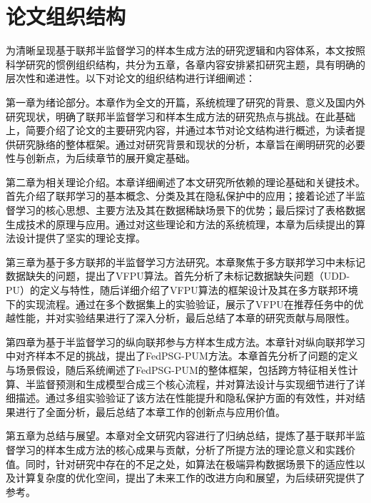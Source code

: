 \section{论文组织结构}
为清晰呈现基于联邦半监督学习的样本生成方法的研究逻辑和内容体系，本文按照科学研究的惯例组织结构，共分为五章，各章内容安排紧扣研究主题，具有明确的层次性和递进性。以下对论文的组织结构进行详细阐述：

第一章为绪论部分。本章作为全文的开篇，系统梳理了研究的背景、意义及国内外研究现状，明确了联邦半监督学习和样本生成方法的研究热点与挑战。在此基础上，简要介绍了论文的主要研究内容，并通过本节对论文结构进行概述，为读者提供研究脉络的整体框架。通过对研究背景和现状的分析，本章旨在阐明研究的必要性与创新点，为后续章节的展开奠定基础。

第二章为相关理论介绍。本章详细阐述了本文研究所依赖的理论基础和关键技术。首先介绍了联邦学习的基本概念、分类及其在隐私保护中的应用；接着论述了半监督学习的核心思想、主要方法及其在数据稀缺场景下的优势；最后探讨了表格数据生成技术的原理与应用。通过对这些理论和方法的系统梳理，本章为后续提出的算法设计提供了坚实的理论支撑。

第三章为基于多方联邦的半监督学习方法研究。本章聚焦于多方联邦学习中未标记数据缺失的问题，提出了VFPU算法。首先分析了未标记数据缺失问题（UDD-PU）的定义与特性，随后详细介绍了VFPU算法的框架设计及其在多方联邦环境下的实现流程。通过在多个数据集上的实验验证，展示了VFPU在推荐任务中的优越性能，并对实验结果进行了深入分析，最后总结了本章的研究贡献与局限性。

第四章为基于半监督学习的纵向联邦参与方样本生成方法。本章针对纵向联邦学习中对齐样本不足的挑战，提出了FedPSG-PUM方法。本章首先分析了问题的定义与场景假设，随后系统阐述了FedPSG-PUM的整体框架，包括跨方特征相关性计算、半监督预测和生成模型合成三个核心流程，并对算法设计与实现细节进行了详细描述。通过多组实验验证了该方法在性能提升和隐私保护方面的有效性，并对结果进行了全面分析，最后总结了本章工作的创新点与应用价值。

第五章为总结与展望。本章对全文研究内容进行了归纳总结，提炼了基于联邦半监督学习的样本生成方法的核心成果与贡献，分析了所提方法的理论意义和实践价值。同时，针对研究中存在的不足之处，如算法在极端异构数据场景下的适应性以及计算复杂度的优化空间，提出了未来工作的改进方向和展望，为后续研究提供了参考。
\clearpage


